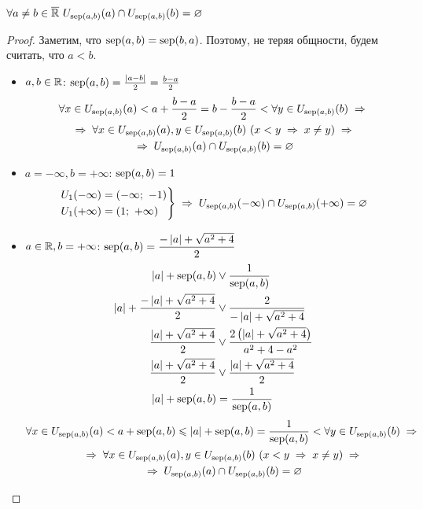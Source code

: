 \begin{lemma}
    \label{SepUIntersect}
    $ \forall a \ne b \in \overline{\mathbb{R}}\ U_{\operatorname{sep}(a, b)}(a) \cap U_{\operatorname{sep}(a, b)}(b) = \varnothing$
\end{lemma}
\begin{proof}
    Заметим, что $\operatorname{sep}(a, b) = \operatorname{sep}(b, a)$. Поэтому, не теряя общности, будем считать, что $a < b$.
    \begin{itemize}
        \item $a, b \in \mathbb{R}$: $\operatorname{sep}(a, b) = \frac{\left\lvert a - b \right\rvert}{2} = \frac{b - a}{2}$
        \begin{multline*}
            \forall x \in U_{\sep(a, b)}(a) < a + \frac{b - a}{2} = b - \frac{b - a}{2} < \forall y \in U_{\sep(a, b)}(b) \thus \\
            \thus \forall x \in U_{\sep(a, b)}(a), y \in U_{\sep(a, b)}(b)\ (x < y \thus x \ne y) \thus \\
            \thus U_{\sep(a, b)}(a) \cap U_{\sep(a, b)}(b) = \varnothing
        \end{multline*}
        
        \item $a = -\infty, b = +\infty$: $\operatorname{sep}(a, b) = 1$
        \begin{equation*}
            \begin{rcases}
                U_1(-\infty) = (-\infty;\ -1) \\
                U_1(+\infty) = (1;\ +\infty)
            \end{rcases} \thus U_{\sep(a, b)}(-\infty) \cap U_{\sep(a, b)}(+\infty) = \varnothing
        \end{equation*}
        
        \item $a \in \mathbb{R}, b = +\infty$: $\operatorname{sep}(a, b) = \dfrac{-\left\lvert a \right\rvert + \sqrt{a^2+4}}{2}$
        \begin{align*}
            \left\lvert a \right\rvert + \operatorname{sep}(a, b) &\vee \frac{1}{\operatorname{sep}(a, b)} \\
            \left\lvert a \right\rvert + \frac{-\left\lvert a \right\rvert + \sqrt{a^2 + 4}}{2} &\vee \frac{2}{-\left\lvert a \right\rvert + \sqrt{a^2 + 4}} \\
            \frac{\left\lvert a \right\rvert + \sqrt{a^2 + 4}}{2} &\vee \frac{2\left(\left\lvert a \right\rvert + \sqrt{a^2 + 4}\right)}{a^2 + 4 - a^2} \\
            \frac{\left\lvert a \right\rvert + \sqrt{a^2 + 4}}{2} &\vee \frac{\left\lvert a \right\rvert + \sqrt{a^2 + 4}}{2} \\
            \left\lvert a \right\rvert + \operatorname{sep}(a, b) &= \frac{1}{\operatorname{sep}(a, b)}
        \end{align*}
        \begin{multline*}
             \forall x \in U_{\sep(a, b)}(a) < a + \sep(a, b) \le \abs{a} + \sep(a, b) = \frac{1}{\sep(a, b)} < \forall y \in U_{\sep(a, b)}(b) \thus \\
            \thus \forall x \in U_{\sep(a, b)}(a), y \in U_{\sep(a, b)}(b)\ (x < y \thus x \ne y) \thus \\
            \thus U_{\sep(a, b)}(a) \cap U_{\sep(a, b)}(b) = \varnothing
        \end{multline*}


\end{itemize}
\end{proof}
